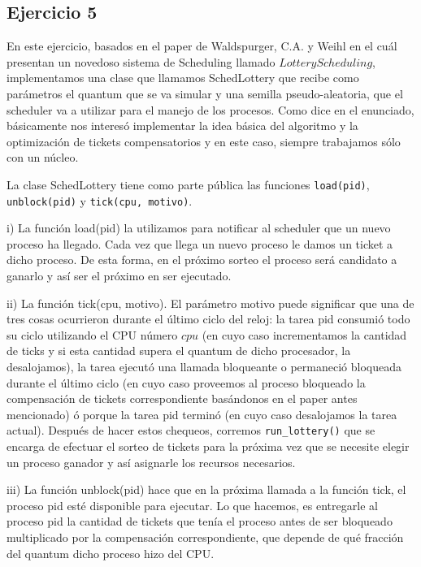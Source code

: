 \documentclass[11pt, a4paper, twoside]{article}
\begin{document}
\clearpage
\subsection{Ejercicio 5}
En este ejercicio, basados en el paper de Waldspurger, C.A. y Weihl en el cuál presentan un 
novedoso sistema de Scheduling llamado $Lottery Scheduling$, implementamos una clase que llamamos
SchedLottery que recibe como parámetros el quantum que se va simular y una semilla 
pseudo-aleatoria, que el scheduler va a utilizar para el manejo de los procesos. Como dice en el
enunciado, básicamente nos interesó implementar la idea básica del algoritmo y la 
optimización de tickets compensatorios y en este caso, siempre trabajamos sólo con un núcleo. 

La clase SchedLottery tiene como parte pública las funciones \texttt{load(pid)}, \texttt{unblock(pid)} 
y \texttt{tick(cpu, motivo)}. 

i) La función load(pid) la utilizamos para notificar al scheduler
que un nuevo proceso ha llegado. Cada vez que llega un nuevo proceso le damos un ticket a dicho proceso.
De esta forma, en el próximo sorteo el proceso será candidato a ganarlo y así ser el próximo 
en ser ejecutado. 

ii) La función
tick(cpu, motivo). El parámetro motivo puede significar que una de tres cosas
ocurrieron durante el último ciclo del reloj: la tarea pid consumió todo su
ciclo utilizando el CPU número $cpu$ (en cuyo caso incrementamos la cantidad de ticks y si esta cantidad supera el
quantum de dicho procesador, la desalojamos), la tarea ejecutó una llamada bloqueante o permaneció 
bloqueada durante el último ciclo (en cuyo caso proveemos al proceso bloqueado la compensación 
de tickets correspondiente basándonos en el paper antes mencionado) ó porque la tarea pid 
terminó (en cuyo caso desalojamos la tarea
actual). Después de hacer estos chequeos, corremos \texttt{run\_lottery()} que se encarga de efectuar el 
sorteo de tickets para la próxima vez que se necesite elegir un proceso ganador y así asignarle 
los recursos necesarios. 

iii) La función unblock(pid) hace que en la próxima llamada a la función tick, el proceso pid 
esté disponible para ejecutar. Lo que hacemos, es entregarle al proceso pid la cantidad de tickets
que tenía el proceso antes de ser bloqueado multiplicado por la compensación correspondiente, que 
depende de qué fracción del quantum dicho proceso hizo del CPU. 
\end{document}
